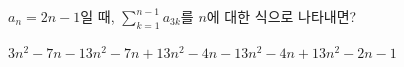 $a_n=2n-1$일 때, $\displaystyle\sum_{k=1}^{n-1}a_{3k}$를 $n$에 대한 식으로 나타내면?
\begin{choicesii}{$3n^2-7n-1$}{$3n^2-7n+1$}{$3n^2-4n-1$}{$3n^2-4n+1$}{$3n^2-2n-1$}\end{choicesii}
